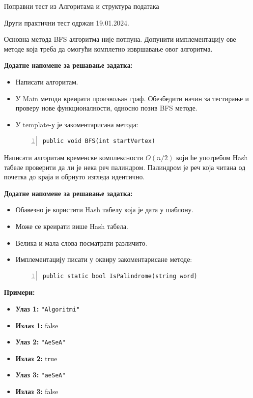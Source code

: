 
Поправни тест из Алгоритама и структура података

Други практични тест одржан 19.01.2024.

Основна метода BFS алгоритма није потпуна. Допунити имплементацију ове методе која треба да омогући комплетно извршавање овог алгоритма.

\textbf{Додатне напомене за решавање задатка:}
\begin{itemize}
	\item Написати алгоритам.
	\item У Main методи креирати произвољан граф. Обезбедити начин за тестирање и проверу нове функционалности, односно позив BFS методе.
	\item У template-у је закоментарисана метода:
	\begin{Verbatim}[fontsize=\footnotesize, numbers=left, xleftmargin=10mm]
public void BFS(int startVertex)
	\end{Verbatim}
\end{itemize}



Написати алгоритам временске комплексности $O(n/2)$ који ће употребом Hash табеле проверити да ли је нека реч палиндром. Палиндром је реч која читана од почетка до краја и обрнуто изгледа идентично.

\textbf{Додатне напомене за решавање задатка:}
\begin{itemize}
	\item Обавезно је користити Hash табелу која је дата у шаблону.
	\item Може се креирати више Hash табела.
	\item Велика и мала слова посматрати различито.
	\item Имплементацију писати у оквиру закоментарисане методе:
	\begin{Verbatim}[fontsize=\footnotesize, numbers=left, xleftmargin=10mm]
public static bool IsPalindrome(string word)
	\end{Verbatim}
\end{itemize}

\textbf{Примери:}
\begin{itemize}
	\item \textbf{Улаз 1:} \texttt{"Algoritmi"}
	\item \textbf{Излаз 1:} false
	\item \textbf{Улаз 2:} \texttt{"AeSeA"}
	\item \textbf{Излаз 2:} true
	\item \textbf{Улаз 3:} \texttt{"aeSeA"}
	\item \textbf{Излаз 3:} false
\end{itemize}



